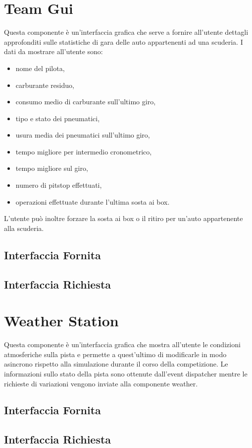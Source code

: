 \documentclass[11pt,a4paper]{report}
\begin{document}
\section{Team Gui}
Questa componente è un'interfaccia grafica che serve a fornire all'utente dettagli approfonditi sulle statistiche di gara delle auto appartenenti ad una scuderia.
I dati da mostrare all'utente sono:
\begin{itemize}
\item nome del pilota,
\item carburante residuo,
\item consumo medio di carburante sull'ultimo giro,
\item tipo e stato dei pneumatici,
\item usura media dei pneumatici sull'ultimo giro,
\item tempo migliore per intermedio cronometrico,
\item tempo migliore sul giro,
\item numero di pitstop effettuati,
\item operazioni effettuate durante l'ultima sosta ai box.
\end{itemize}
L'utente può inoltre forzare la sosta ai box o il ritiro per un'auto appartenente alla scuderia.
\subsection*{Interfaccia Fornita}
\subsection*{Interfaccia Richiesta}
\section{Weather Station}
Questa componente è un'interfaccia grafica che mostra all'utente le condizioni atmosferiche sulla pista e permette a quest'ultimo di modificarle in modo asincrono rispetto alla simulazione durante il corso della competizione. Le informazioni sullo stato della pista sono ottenute dall'event dispatcher mentre le richieste di variazioni vengono inviate alla componente weather.

\subsection*{Interfaccia Fornita}
\subsection*{Interfaccia Richiesta}
\end{document}
